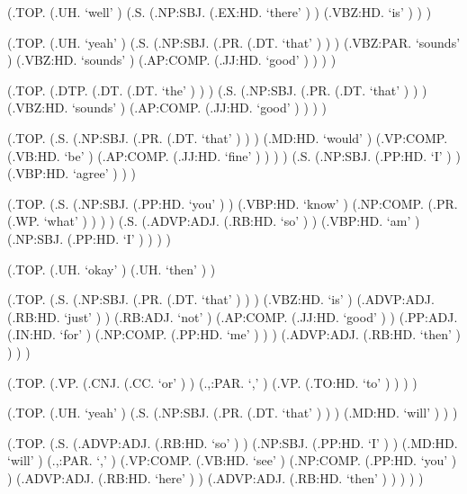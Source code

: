\documentclass[10pt]{article}
\begin{document}
\begin{parsetree}  (.TOP. (.UH. `well' ) (.S. (.NP:SBJ. (.EX:HD. `there' ) ) (.VBZ:HD. `is' ) ) ) \end{parsetree}

\begin{parsetree}  (.TOP. (.UH. `yeah' ) (.S. (.NP:SBJ. (.PR. (.DT. `that' ) ) ) (.VBZ:PAR. `sounds' ) (.VBZ:HD. `sounds' ) (.AP:COMP. (.JJ:HD. `good' ) ) ) ) \end{parsetree}

\begin{parsetree}  (.TOP. (.DTP. (.DT. (.DT. `the' ) ) ) (.S. (.NP:SBJ. (.PR. (.DT. `that' ) ) ) (.VBZ:HD. `sounds' ) (.AP:COMP. (.JJ:HD. `good' ) ) ) ) \end{parsetree}

\begin{parsetree}  (.TOP. (.S. (.NP:SBJ. (.PR. (.DT. `that' ) ) ) (.MD:HD. `would' ) (.VP:COMP. (.VB:HD. `be' ) (.AP:COMP. (.JJ:HD. `fine' ) ) ) ) (.S. (.NP:SBJ. (.PP:HD. `I' ) ) (.VBP:HD. `agree' ) ) ) \end{parsetree}

\begin{parsetree}  (.TOP. (.S. (.NP:SBJ. (.PP:HD. `you' ) ) (.VBP:HD. `know' ) (.NP:COMP. (.PR. (.WP. `what' ) ) ) ) (.S. (.ADVP:ADJ. (.RB:HD. `so' ) ) (.VBP:HD. `am' ) (.NP:SBJ. (.PP:HD. `I' ) ) ) ) \end{parsetree}

\begin{parsetree}  (.TOP. (.UH. `okay' ) (.UH. `then' ) ) \end{parsetree}

\begin{parsetree}  (.TOP. (.S. (.NP:SBJ. (.PR. (.DT. `that' ) ) ) (.VBZ:HD. `is' ) (.ADVP:ADJ. (.RB:HD. `just' ) ) (.RB:ADJ. `not' ) (.AP:COMP. (.JJ:HD. `good' ) ) (.PP:ADJ. (.IN:HD. `for' ) (.NP:COMP. (.PP:HD. `me' ) ) ) (.ADVP:ADJ. (.RB:HD. `then' ) ) ) ) \end{parsetree}

\begin{parsetree}  (.TOP. (.VP. (.CNJ. (.CC. `or' ) ) (.,:PAR. `,' ) (.VP. (.TO:HD. `to' ) ) ) ) \end{parsetree}

\begin{parsetree}  (.TOP. (.UH. `yeah' ) (.S. (.NP:SBJ. (.PR. (.DT. `that' ) ) ) (.MD:HD. `will' ) ) ) \end{parsetree}

\begin{parsetree}  (.TOP. (.S. (.ADVP:ADJ. (.RB:HD. `so' ) ) (.NP:SBJ. (.PP:HD. `I' ) ) (.MD:HD. `will' ) (.,:PAR. `,' ) (.VP:COMP. (.VB:HD. `see' ) (.NP:COMP. (.PP:HD. `you' ) ) (.ADVP:ADJ. (.RB:HD. `here' ) ) (.ADVP:ADJ. (.RB:HD. `then' ) ) ) ) ) \end{parsetree}
\end{document}
